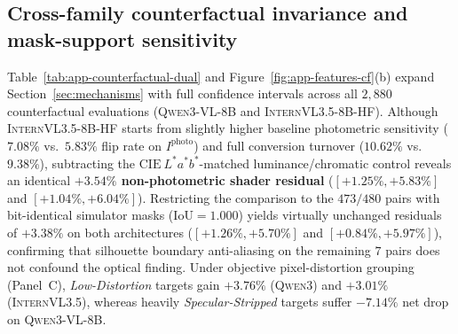 \subsection{Cross-family counterfactual invariance and mask-support sensitivity}
Table~\ref{tab:app-counterfactual-dual} and Figure~\ref{fig:app-features-cf}(b) expand Section~\ref{sec:mechanisms} with full confidence intervals across all $2{,}880$ counterfactual evaluations (\textsc{Qwen3-VL-8B} and \textsc{InternVL3.5-8B-HF}). Although \textsc{InternVL3.5-8B-HF} starts from slightly higher baseline photometric sensitivity ($7.08\%$ vs.\ $5.83\%$ flip rate on $I^{\text{photo}}$) and full conversion turnover ($10.62\%$ vs.\ $9.38\%$), subtracting the $\mathrm{CIE}~L^*a^*b^*$-matched luminance/chromatic control reveals an identical \textbf{$+3.54\%$ non-photometric shader residual} ($[+1.25\%, +5.83\%]$ and $[+1.04\%, +6.04\%]$). Restricting the comparison to the $473/480$ pairs with bit-identical simulator masks ($\mathrm{IoU}{=}1.000$) yields virtually unchanged residuals of \textbf{$+3.38\%$} on both architectures ($[+1.26\%, +5.70\%]$ and $[+0.84\%, +5.97\%]$), confirming that silhouette boundary anti-aliasing on the remaining $7$ pairs does not confound the optical finding. Under objective pixel-distortion grouping (Panel~C), \emph{Low-Distortion} targets gain $+3.76\%$ (\textsc{Qwen3}) and $+3.01\%$ (\textsc{InternVL3.5}), whereas heavily \emph{Specular-Stripped} targets suffer $-7.14\%$ net drop on \textsc{Qwen3-VL-8B}.

\begin{table}[!t]
\centering
\caption{Complete 21-feature zero-\textsc{VLM} risk-gate inventory (\texttt{deploy\_auto}), reporting group membership, mean $\pm$ SD stratified by \textsc{Qwen3-VL} regression status (\texttt{any\_8b\_32b\_loss}: $455$ non-loss vs.\ $25$ loss pairs), direction-aligned univariate \textsc{AUROC}, and fitted standardized $\ell_2$ weights ($C{=}0.01$).}
\label{tab:app-features21}
\resizebox{\textwidth}{!}{}
\end{table}

